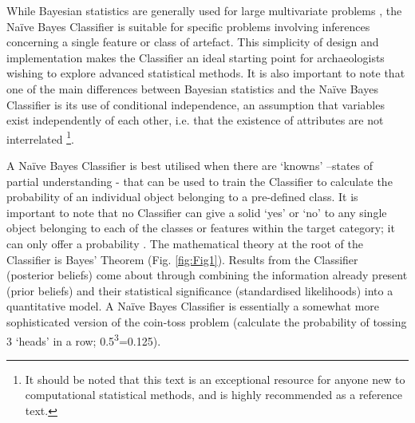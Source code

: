 	While Bayesian statistics are generally used for large multivariate problems \parencite[129--134]{Buck_1996}, the Naïve Bayes Classifier is suitable for specific problems involving inferences concerning a single feature or class of artefact. This simplicity of design and implementation makes the Classifier an ideal starting point for archaeologists wishing to explore advanced statistical methods. It is also important to note that one of the main differences between Bayesian statistics and the Naïve Bayes Classifier is its use of conditional independence, an assumption that variables exist independently of each other, i.e. that the existence of attributes are not interrelated \parencite[231]{Tan_2006}\footnote{It should be noted that this text is an exceptional resource for anyone new to computational statistical methods, and is highly recommended as a reference text.}. 
	
	
	A Naïve Bayes Classifier is best utilised when there are ‘knowns’ –states of partial understanding \parencite[192]{Orton_1992} - that can be used to train the Classifier to calculate the probability of an individual object belonging to a pre-defined class. It is important to note that no Classifier can give a solid ‘yes’ or ‘no’ to any single object belonging to each of the classes or features within the target category; it can only offer a probability \parencite[235]{Tan_2006}. The mathematical theory at the root of the Classifier is Bayes’ Theorem (Fig. \ref{fig:Fig1}). Results from the Classifier (posterior beliefs) come about through combining the information already present (prior beliefs) and their statistical significance (standardised likelihoods) into a quantitative model. A Naïve Bayes Classifier is essentially a somewhat more sophisticated version of the coin-toss problem (calculate the probability of tossing 3 ‘heads’ in a row; 0.5\textsuperscript{3}=0.125). 
	
